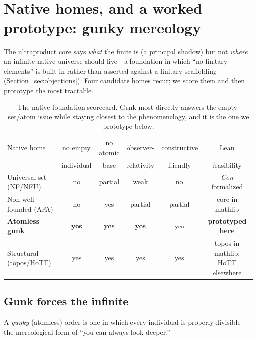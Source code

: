 \documentclass[]{article}
\theoremstyle{definition}
\theoremstyle{remark}
\begin{document}
\section{Native homes, and a worked prototype: gunky mereology}
\label{sec:gunk}

The ultraproduct core says \emph{what} the finite is (a principal shadow) but not
\emph{where} an infinite-native universe should live---a foundation in which ``no
finitary elements'' is built in rather than asserted against a finitary scaffolding
(Section~\ref{sec:objections}). Four candidate homes recur; we score them and then
prototype the most tractable.

\begin{table}[H]
\centering\small
\begin{tabular}{@{}lccccc@{}}
\toprule
Native home & no empty & no atomic & observer- & constructive & Lean \\
 & individual & base & relativity & friendly & feasibility \\
\midrule
Universal-set (NF/NFU) & no & partial & weak & no & \emph{Con} formalized\footnotemark \\
Non-well-founded (AFA) & no & yes & partial & partial & core in mathlib \\
\textbf{Atomless gunk} & \textbf{yes} & \textbf{yes} & \textbf{yes} & yes & \textbf{prototyped here} \\
Structural (topos/HoTT) & yes & yes & yes & yes & topos in mathlib; HoTT elsewhere \\
\bottomrule
\end{tabular}
\caption{The native-foundation scorecard. Gunk most directly answers the
empty-set/atom issue while staying closest to the phenomenology, and it is the one we
prototype below.}
\label{tab:homes}
\end{table}

\subsection{Gunk forces the infinite}
\label{sec:gunk-core}

A \emph{gunky} (atomless) order is one in which every individual is properly
divisible---the mereological form of ``you can always look deeper.''
\end{document}
